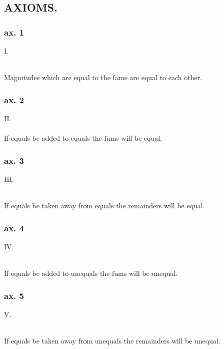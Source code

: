 \begin{minipage}{0.165\textwidth}
  \phantom{}
\end{minipage}%
\begin{minipage}{0.67\textwidth}
  \subsection[Axioms]{\centering \scshape{\LARGE{AXIOMS.}}}
  \label{subsec:axioms}

  \hfill

  \subsubsection{ax. 1}
  \begin{center}
    I.\label{ax1}\\
    \hfill\\
    \raggedright Magnitudes which are equal to the ſame are equal to each other.\\
  \end{center}
  \subsubsection{ax. 2}
  \begin{center}
    II.\label{ax2}\\
    \hfill\\
    If equals be added to equals the ſums will be equal.\\
  \end{center}
  \subsubsection{ax. 3}
  \begin{center}
    III.\label{ax3}\\
    \hfill\\
    \raggedright If equals be taken away from equals the remainders will be equal.\\
  \end{center}
  \subsubsection{ax. 4}
  \begin{center}
    IV.\label{ax4}\\
    \hfill\\
    \raggedright If equals be added to unequals the ſums will be unequal.\\
  \end{center}
  \subsubsection{ax. 5}
  \begin{center}
    V.\label{ax5}\\
    \hfill\\
    \raggedright If equals be taken away from unequals the remainders will be unequal.
  \end{center}
\end{minipage}
